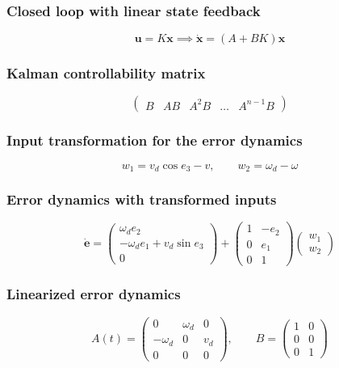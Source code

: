 \subsubsection{Closed loop with linear state feedback}
\begin{equation*}
    \mathbf u=K\mathbf x\implies\dot{\mathbf x}=(A+BK)\mathbf x
\end{equation*}

\subsubsection{Kalman controllability matrix}
\begin{equation*}
    \begin{pmatrix}B&AB&A^2B&\dots&A^{n-1}B\end{pmatrix}
\end{equation*}

\subsubsection{Input transformation for the error dynamics}
\begin{equation*}
    w_1=v_d\cos e_3-v,\qquad w_2=\omega_d-\omega
\end{equation*}

\subsubsection{Error dynamics with transformed inputs}
\begin{equation*}
    \dot{\mathbf e}=\begin{pmatrix}\omega_de_2\\-\omega_de_1+v_d\sin e_3\\0\end{pmatrix}+\begin{pmatrix}1&-e_2\\0&e_1\\0&1\end{pmatrix}\begin{pmatrix}w_1\\w_2\end{pmatrix}
\end{equation*}

\subsubsection{Linearized error dynamics}
\begin{equation*}
    A(t)=\begin{pmatrix}0&\omega_d&0\\-\omega_d&0&v_d\\0&0&0\end{pmatrix},\qquad B=\begin{pmatrix}1&0\\0&0\\0&1\end{pmatrix}
\end{equation*}


